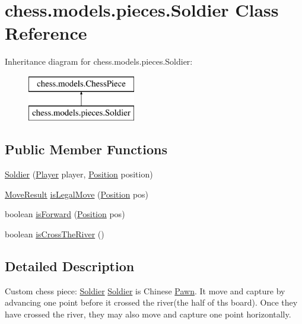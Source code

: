 \hypertarget{classchess_1_1models_1_1pieces_1_1_soldier}{}\section{chess.\+models.\+pieces.\+Soldier Class Reference}
\label{classchess_1_1models_1_1pieces_1_1_soldier}
Inheritance diagram for chess.\+models.\+pieces.\+Soldier\+:\begin{figure}[H]
\begin{center}
\leavevmode
\includegraphics[height=2.000000cm]{classchess_1_1models_1_1pieces_1_1_soldier}
\end{center}
\end{figure}
\subsection*{Public Member Functions}
\begin{DoxyCompactItemize}
\item 
\mbox{\hyperlink{classchess_1_1models_1_1pieces_1_1_soldier_a3de8743b5a054a97b126297e3e5fea36}{Soldier}} (\mbox{\hyperlink{enumchess_1_1models_1_1enums_1_1_player}{Player}} player, \mbox{\hyperlink{classchess_1_1models_1_1_position}{Position}} position)
\item 
\mbox{\hyperlink{enumchess_1_1models_1_1enums_1_1_move_result}{Move\+Result}} \mbox{\hyperlink{classchess_1_1models_1_1pieces_1_1_soldier_a5a0cc5ebe1f0a4b2b68b9359f5bad0c5}{is\+Legal\+Move}} (\mbox{\hyperlink{classchess_1_1models_1_1_position}{Position}} pos)
\item 
boolean \mbox{\hyperlink{classchess_1_1models_1_1pieces_1_1_soldier_a3be305544d8e788663b6c394d334f596}{is\+Forward}} (\mbox{\hyperlink{classchess_1_1models_1_1_position}{Position}} pos)
\item 
boolean \mbox{\hyperlink{classchess_1_1models_1_1pieces_1_1_soldier_a9ee2ecb79068bd41f01608f23cd8dd01}{is\+Cross\+The\+River}} ()
\end{DoxyCompactItemize}


\subsection{Detailed Description}
Custom chess piece\+: \mbox{\hyperlink{classchess_1_1models_1_1pieces_1_1_soldier}{Soldier}} \mbox{\hyperlink{classchess_1_1models_1_1pieces_1_1_soldier}{Soldier}} is Chinese \mbox{\hyperlink{classchess_1_1models_1_1pieces_1_1_pawn}{Pawn}}. It move and capture by advancing one point before it crossed the river(the half of ths board). Once they have crossed the river, they may also move and capture one point horizontally. 


